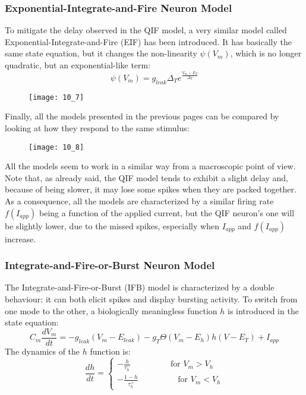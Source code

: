 \subsubsection{Exponential-Integrate-and-Fire Neuron Model}
To mitigate the delay observed in the QIF model, a very similar model called Exponential-Integrate-and-Fire (EIF)
has been introduced. It has basically the same state equation, but it changes the non-linearity \(\psi(V_{m})\),
which is no longer quadratic, but an exponential-like term:
\begin{equation*}
    \psi(V_{m})=g_{leak}\Delta_{T}e^{\frac{V_{m}-E_{T}}{\Delta_{T}}}
\end{equation*}
\begin{figure}[H]
    \texttt{[image: 10\_7]}
    \centering
\end{figure}
\par
Finally, all the models presented in the previous pages can be compared by looking at how they respond
to the same stimulus:
\begin{figure}[H]
    \texttt{[image: 10\_8]}
    \centering
\end{figure}
All the models seem to work in a similar way from a macroscopic point of view. Note that, as already said,
the QIF model tends to exhibit a slight delay and, because of being slower, it may lose some spikes
when they are packed together. As a consequence, all the models are characterized by a similar
firing rate \(f(I_{app})\) being a function of the applied current, but the QIF neuron's one will
be slightly lower, due to the missed spikes, especially when \(I_{app}\) and \(f(I_{app})\) increase.
\subsubsection{Integrate-and-Fire-or-Burst Neuron Model}
The Integrate-and-Fire-or-Burst (IFB) model is characterized by a double behaviour: it can both
elicit spikes and display bursting activity. To switch from one mode to the other, a biologically
meaningless function \(h\) is introduced in the state equation:
\begin{equation*}
    C_{m}\frac{dV_{m}}{dt}=-g_{leak}(V_{m}-E_{leak})-g_{T}\Theta(V_{m}-E_{h})h(V-E_{T})+I_{app}
\end{equation*}
The dynamics of the \(h\) function is:
\begin{equation*}
    \frac{dh}{dt}=
    \begin{cases}
        -\frac{h}{\tau_{h}^{-}}\hspace{2cm}\text{for }V_{m}>V_{h} \\
        -\frac{1-h}{\tau_{h}^{+}}\hspace{2cm}\text{for }V_{m}<V_{h}
    \end{cases}
\end{equation*}
